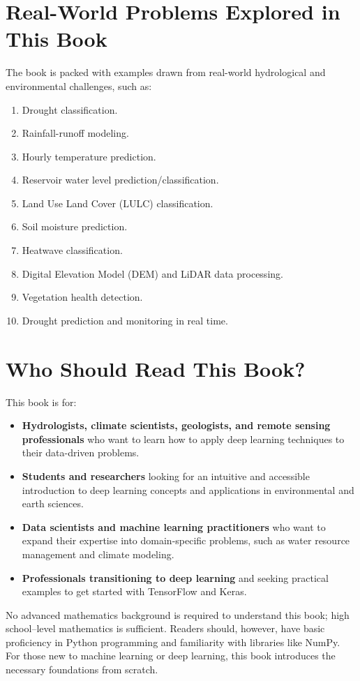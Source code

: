 \section*{Real-World Problems Explored in This Book}
The book is packed with examples drawn from real-world hydrological and environmental challenges, such as:
\begin{enumerate}
    \item Drought classification.
    \item Rainfall-runoff modeling.
    \item Hourly temperature prediction.
    \item Reservoir water level prediction/classification.
    \item Land Use Land Cover (LULC) classification.
    \item Soil moisture prediction.
    \item Heatwave classification.
    \item Digital Elevation Model (DEM) and LiDAR data processing.
    \item Vegetation health detection.
    \item Drought prediction and monitoring in real time.
\end{enumerate}

\section*{Who Should Read This Book?}
This book is for:
\begin{itemize}
    \item \textbf{Hydrologists, climate scientists, geologists, and remote sensing professionals} who want to learn how to apply deep learning techniques to their data-driven problems.
    \item \textbf{Students and researchers} looking for an intuitive and accessible introduction to deep learning concepts and applications in environmental and earth sciences.
    \item \textbf{Data scientists and machine learning practitioners} who want to expand their expertise into domain-specific problems, such as water resource management and climate modeling.
    \item \textbf{Professionals transitioning to deep learning} and seeking practical examples to get started with TensorFlow and Keras.
\end{itemize}

No advanced mathematics background is required to understand this book; high school–level mathematics is sufficient. Readers should, however, have basic proficiency in Python programming and familiarity with libraries like NumPy. For those new to machine learning or deep learning, this book introduces the necessary foundations from scratch.

